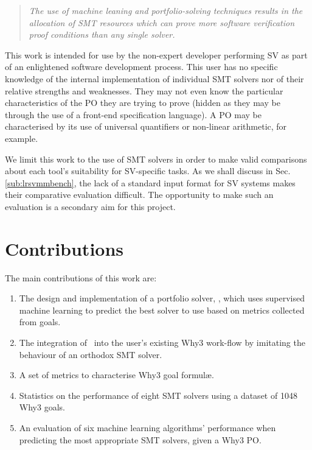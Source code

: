 \begin{quote}
	
	\textit{The use of machine leaning and portfolio-solving techniques results in the allocation of SMT resources which can prove more software verification proof conditions than any single solver.}
	
\end{quote}

This work is intended for use by the non-expert developer performing SV as part of an enlightened software development process.
This user has no specific knowledge of the internal implementation of individual SMT solvers nor of their relative strengths and weaknesses. 
They may not even know the particular characteristics of the PO they are trying to prove (hidden as they may be through the use of a front-end specification language).
A PO may be characterised by its use of universal quantifiers or non-linear arithmetic, for example.

We limit this work to the use of SMT solvers in order to make valid comparisons about each tool's suitability for SV-specific tasks.
As we shall discuss in Sec. \ref{sub:lrsvmmbench}, the lack of a standard input format for SV systems makes their comparative evaluation difficult.
The opportunity to make such an evaluation is a secondary aim for this project.

\section{Contributions}
The main contributions of this work are:
\begin{enumerate}
	\item The design  and implementation of a portfolio solver, \where, which uses supervised machine learning to predict the best solver to use based on metrics collected from goals.
	\item The integration of \where~into the user's existing \textsf{Why3} work-flow by imitating the behaviour of an orthodox SMT solver.
	\item A set of metrics to characterise \textsf{Why3} goal formul\ae.
	\item Statistics on the performance of eight SMT solvers using a dataset of 1048 \textsf{Why3} goals.
	\item An evaluation of six machine learning algorithms' performance when predicting the most appropriate SMT solvers, given a \textsf{Why3} PO.  
	
\end{enumerate}


